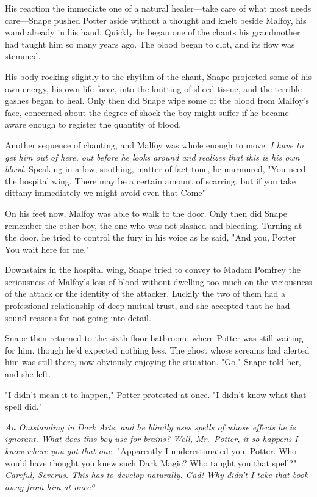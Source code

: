 His reaction the immediate one of a natural healer—take care of what most needs care—Snape pushed Potter aside without a thought and knelt beside Malfoy, his wand already in his hand. Quickly he began one of the chants his grandmother had taught him so many years ago. The blood began to clot, and its flow was stemmed.

His body rocking slightly to the rhythm of the chant, Snape projected some of his own energy, his own life force, into the knitting of sliced tissue, and the terrible gashes began to heal. Only then did Snape wipe some of the blood from Malfoy's face, concerned about the degree of shock the boy might suffer if he became aware enough to register the quantity of blood.

Another sequence of chanting, and Malfoy was whole enough to move. \emph{I have to get him out of here, out before he looks around and realizes that this is his own blood.} Speaking in a low, soothing, matter-of-fact tone, he murmured, "You need the hospital wing. There may be a certain amount of scarring, but if you take dittany immediately we might avoid even that{\el} Come{\el}"

On his feet now, Malfoy was able to walk to the door. Only then did Snape remember the other boy, the one who was not slashed and bleeding. Turning at the door, he tried to control the fury in his voice as he said, "And you, Potter{\el} You wait here for me."

Downstairs in the hospital wing, Snape tried to convey to Madam Pomfrey the seriousness of Malfoy's loss of blood without dwelling too much on the viciousness of the attack or the identity of the attacker. Luckily the two of them had a professional relationship of deep mutual trust, and she accepted that he had sound reasons for not going into detail.

Snape then returned to the sixth floor bathroom, where Potter was still waiting for him, though he'd expected nothing less. The ghost whose screams had alerted him was still there, now obviously enjoying the situation. "Go," Snape told her, and she left.

"I didn't mean it to happen," Potter protested at once. "I didn't know what that spell did."

\emph{An Outstanding in Dark Arts, and he blindly uses spells of whose effects he is ignorant. What does this boy use for brains? Well, Mr.~Potter, it so happens I know where you got that one.} "Apparently I underestimated you, Potter. Who would have thought you knew such Dark Magic? Who taught you that spell?" \emph{Careful, Severus. This has to develop naturally. Gad! Why didn't I take that book away from him at once?}

